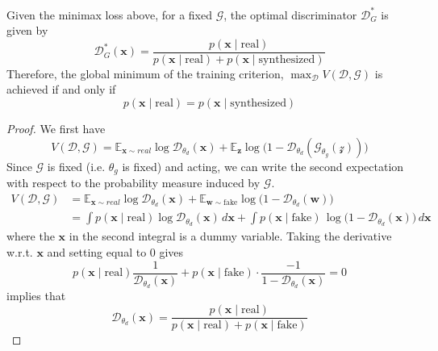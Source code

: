   \begin{theorem} 
    Given the minimax loss above, for a fixed $\mathcal{G}$, the optimal discriminator $\mathcal{D}_G^\ast$ is given by 
    \begin{equation}
      \mathcal{D}_G^\ast (\mathbf{x}) = \frac{p(\mathbf{x} \mid \text{real})}{p(\mathbf{x} \mid \text{real}) + p(\mathbf{x} \mid \text{synthesized})}
    \end{equation}
    Therefore, the global minimum of the training criterion, $\max_{\mathcal{D}} V(\mathcal{D}, \mathcal{G})$ is achieved if and only if 
    \begin{equation}
      p(\mathbf{x} \mid \text{real}) = p(\mathbf{x} \mid \text{synthesized})
    \end{equation}
  \end{theorem}
  \begin{proof} 
    We first have 
    \begin{equation}
      V(\mathcal{D}, \mathcal{G}) = \mathbb{E}_{\mathbf{x} \sim real} \log \mathcal{D}_{\theta_d} (\mathbf{x}) + \mathbb{E}_{\mathbf{z}} \log \big( 1 - \mathcal{D}_{\theta_d} (\mathcal{G}_{\theta_g} (\mathcal{z}))\big) 
    \end{equation}
    Since $\mathcal{G}$ is fixed (i.e. $\theta_g$ is fixed) and acting, we can write the second expectation with respect to the probability measure induced by $\mathcal{G}$.
    \begin{align*} 
      V(\mathcal{D}, \mathcal{G}) & = \mathbb{E}_{\mathbf{x} \sim real} \log \mathcal{D}_{\theta_d} (\mathbf{x}) + \mathbb{E}_{\mathbf{w} \sim \text{fake}} \log \big( 1 - \mathcal{D}_{\theta_d} (\mathbf{w}) \big) \\   
                                      & = \int p(\mathbf{x} \mid \text{real}) \log \mathcal{D}_{\theta_d}(\mathbf{x}) \,d\mathbf{x}+ \int p(\mathbf{x} \mid \text{fake}) \, \log \big( 1 - \mathcal{D}_{\theta_d} (\mathbf{x}) \big) \,d\mathbf{x} 
    \end{align*}
    where the $\mathbf{x}$ in the second integral is a dummy variable. Taking the derivative w.r.t. $\mathbf{x}$ and setting equal to $0$ gives 
    \begin{equation}
      p(\mathbf{x} \mid \text{real}) \frac{1}{\mathcal{D}_{\theta_d} (\mathbf{x})} + p(\mathbf{x} \mid \text{fake}) \cdot \frac{-1}{1 - \mathcal{D}_{\theta_d}(\mathbf{x})} = 0
    \end{equation}
    implies that 
    \begin{equation}
      \mathcal{D}_{\theta_d}( \mathbf{x}) = \frac{p(\mathbf{x} \mid \text{real})}{p(\mathbf{x} \mid \text{real}) + p(\mathbf{x} \mid \text{fake})}
    \end{equation}
  \end{proof} 

